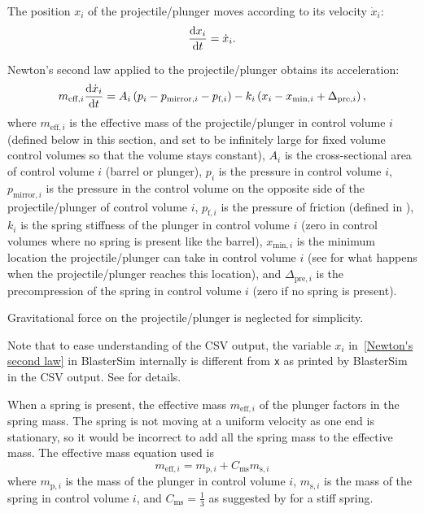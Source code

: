 The position $x_i$ of the projectile/plunger moves according to its velocity $\dot{x}_i$:
\begin{equation}
    \dv{x_i}{t} = \dot{x}_i.
\end{equation}

Newton's second law applied to the projectile/plunger obtains its acceleration:
\begin{equation}
    m_{\text{eff},i} \dv{\dot{x}_i}{t} =
    A_i \left(p_i - p_{\text{mirror},i} - p_{\text{f},i}\right)
    - k_i \left(x_i - x_{\text{min},i} + \Delta_{\text{pre},i}\right), \label{eq:Newton's second law}
\end{equation}
where
$m_{\text{eff},i}$ is the effective mass of the projectile/plunger in control volume $i$ (defined below in this section, and set to be infinitely large for fixed volume control volumes so that the volume stays constant),
$A_i$ is the cross-sectional area of control volume $i$ (barrel or plunger),
$p_i$ is the pressure in control volume $i$,
$p_{\text{mirror},i}$ is the pressure in the control volume on the opposite side of the projectile/plunger of control volume $i$,
$p_{\text{f},i}$ is the pressure of friction (defined in ),
$k_i$ is the spring stiffness of the plunger in control volume $i$ (zero in control volumes where no spring is present like the barrel),
$x_{\text{min},i}$ is the minimum location the projectile/plunger can take in control volume $i$ (see  for what happens when the projectile/plunger reaches this location), and
$\Delta_{\text{pre},i}$ is the precompression of the spring in control volume $i$ (zero if no spring is present).

Gravitational force on the projectile/plunger is neglected for simplicity.

Note that to ease understanding of the CSV output, the variable $x_i$ in~\eqref{Newton's second law} in BlasterSim internally is different from \texttt{x} as printed by BlasterSim in the CSV output.
See  for details.

When a spring is present, the effective mass $m_{\text{eff},i}$ of the plunger factors in the spring mass.
The spring is not moving at a uniform velocity as one end is stationary, so it would be incorrect to add all the spring mass to the effective mass.
The effective mass equation used is
\begin{equation}
    m_{\text{eff},i} = m_{\text{p},i} + C_\text{ms} m_{\text{s},i}\label{eq:effective mass}
\end{equation}
where
$m_{\text{p},i}$ is the mass of the plunger in control volume $i$,
$m_{\text{s},i}$ is the mass of the spring in control volume $i$, and
$C_\text{ms} = \tfrac{1}{3}$ as suggested by \citet{ruby_equivalent_2000} for a stiff spring.

